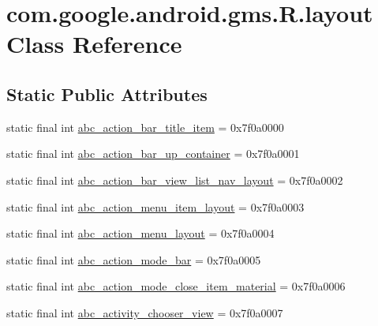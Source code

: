 \hypertarget{classcom_1_1google_1_1android_1_1gms_1_1R_1_1layout}{}\section{com.\+google.\+android.\+gms.\+R.\+layout Class Reference}
\label{classcom_1_1google_1_1android_1_1gms_1_1R_1_1layout}
\subsection*{Static Public Attributes}
\begin{DoxyCompactItemize}
\item 
static final int \mbox{\hyperlink{classcom_1_1google_1_1android_1_1gms_1_1R_1_1layout_a21e5e8fa9a642e7fe4b194125333bd70}{abc\+\_\+action\+\_\+bar\+\_\+title\+\_\+item}} = 0x7f0a0000
\item 
static final int \mbox{\hyperlink{classcom_1_1google_1_1android_1_1gms_1_1R_1_1layout_ab79973fab53aad3385fd335b9e290413}{abc\+\_\+action\+\_\+bar\+\_\+up\+\_\+container}} = 0x7f0a0001
\item 
static final int \mbox{\hyperlink{classcom_1_1google_1_1android_1_1gms_1_1R_1_1layout_a9377064ad14238a6c5128cc4212bbb28}{abc\+\_\+action\+\_\+bar\+\_\+view\+\_\+list\+\_\+nav\+\_\+layout}} = 0x7f0a0002
\item 
static final int \mbox{\hyperlink{classcom_1_1google_1_1android_1_1gms_1_1R_1_1layout_a086606aa9439a3fda75ba725a34c999f}{abc\+\_\+action\+\_\+menu\+\_\+item\+\_\+layout}} = 0x7f0a0003
\item 
static final int \mbox{\hyperlink{classcom_1_1google_1_1android_1_1gms_1_1R_1_1layout_ae49feeb376c8250dc2cfe14ba3a3fde5}{abc\+\_\+action\+\_\+menu\+\_\+layout}} = 0x7f0a0004
\item 
static final int \mbox{\hyperlink{classcom_1_1google_1_1android_1_1gms_1_1R_1_1layout_a6879617d17e434317c6ad9aa6338eec2}{abc\+\_\+action\+\_\+mode\+\_\+bar}} = 0x7f0a0005
\item 
static final int \mbox{\hyperlink{classcom_1_1google_1_1android_1_1gms_1_1R_1_1layout_aa0f80ab6543410347b8c5acd2452fdce}{abc\+\_\+action\+\_\+mode\+\_\+close\+\_\+item\+\_\+material}} = 0x7f0a0006
\item 
static final int \mbox{\hyperlink{classcom_1_1google_1_1android_1_1gms_1_1R_1_1layout_abe20e17ae40c32480a2f5e8633271a29}{abc\+\_\+activity\+\_\+chooser\+\_\+view}} = 0x7f0a0007
\item 

\end{DoxyCompactItemize}
